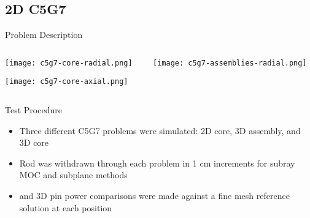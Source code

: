 
\subsection{2D C5G7}
\begin{frame}[t]{Problem Description}
 
\begin{columns}
\begin{column}{0.6\textwidth}
\vspace{-0.25in}
\begin{center}
\texttt{[image: c5g7-core-radial.png]}

\texttt{[image: c5g7-core-axial.png]}
\end{center}
\end{column}
\begin{column}{0.4\textwidth}
    \begin{center}
    \texttt{[image: c5g7-assemblies-radial.png]}
\end{center}
\end{column}
\end{columns}
    
\end{frame}


\begin{frame}[t]{Test Procedure}
    
    \begin{itemize}
        \item Three different C5G7 problems were simulated: 2D core, 3D assembly, and 3D core
        \item Rod was withdrawn through each problem in 1 cm increments for subray MOC and subplane methods
        \item \keff{} and 3D pin power comparisons were made against a fine mesh reference solution at each position
    \end{itemize}
    
\end{frame}


